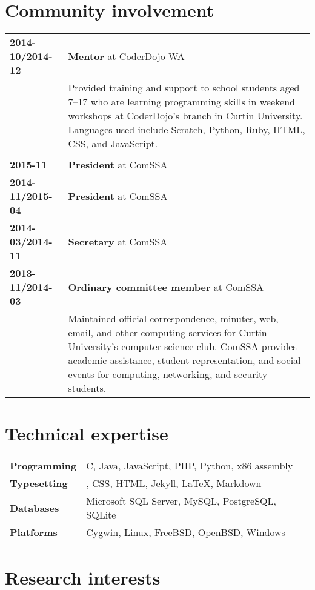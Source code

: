 \documentclass[a4paper,12pt]{article}
\begin{document}
\section*{Community involvement}

\begin{tabular}{p{3.5cm}p{12.5cm}}
	\textbf{2014-10/2014-12} &
		\textbf{Mentor} at CoderDojo WA\\ &
		Provided training and support to school students aged 7--17
		who are learning programming skills in weekend workshops at
		CoderDojo's branch in Curtin University. Languages used include
		Scratch, Python, Ruby, HTML, CSS, and JavaScript.\\\\
	\textbf{2015-11} &
		\textbf{President} at ComSSA\\
	\textbf{2014-11/2015-04} &
		\textbf{President} at ComSSA\\
	\textbf{2014-03/2014-11} &
		\textbf{Secretary} at ComSSA\\
	\textbf{2013-11/2014-03} &
		\textbf{Ordinary committee member} at ComSSA\\ &
		Maintained official correspondence, minutes, web, email, and
		other computing services for Curtin University's computer
		science club. ComSSA provides academic assistance, student
		representation, and social events for computing, networking,
		and security students.
\end{tabular}

\newpage

\section*{Technical expertise}

\begin{tabular}{p{3.5cm}p{12.5cm}}
	\textbf{Programming} &
		C, Java, JavaScript, PHP, Python, x86 assembly \\
	\textbf{Typesetting} &
		\hologo{BibTeX}, CSS, HTML, Jekyll, \LaTeX, Markdown \\
	\textbf{Databases} &
		Microsoft SQL Server, MySQL, PostgreSQL, SQLite \\
	\textbf{Platforms} &
		Cygwin, Linux, FreeBSD, OpenBSD, Windows
\end{tabular}

\section*{Research interests}
\end{document}

